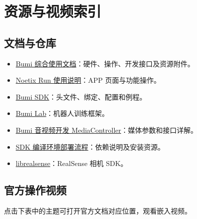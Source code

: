 \chapter{资源与视频索引}
\label{app:resources}
\section{文档与仓库}
\begin{itemize}
\item \href{https://noetixrobotics.feishu.cn/docx/As2adPO27odPBfxQw1ucK6N4nNe}{Bumi 综合使用文档}：硬件、操作、开发接口及资源附件。
\item \href{http://app-file.noetixrobotics.com/page/appUseCn.html}{Noetix Run 使用说明}：APP 页面与功能操作。
\item \href{https://github.com/Noetix-Robotics/noetix_sdk_bumi}{Bumi SDK}：头文件、绑定、配置和例程。
\item \href{https://github.com/Noetix-Robotics/noetix_bumi_lab}{Bumi Lab}：机器人训练框架。
\item \href{https://noetixrobotics.feishu.cn/docx/DSXLdLLOXo15vKx4baDcXOfTnue}{Bumi 音视频开发 MediaController}：媒体参数和接口详解。
\item \href{https://noetixrobotics.feishu.cn/docx/PP2BdXkSUoQ2VOxctJKcEdHanAg}{SDK 编译环境部署流程}：依赖说明及安装资源。
\item \href{https://github.com/IntelRealSense/librealsense}{librealsense}：RealSense 相机 SDK。
\end{itemize}
\section{官方操作视频}
点击下表中的主题可打开官方文档对应位置，观看嵌入视频。

